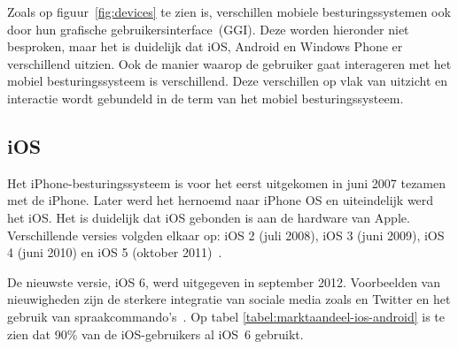 Zoals op figuur~\ref{fig:devices} te zien is, verschillen mobiele besturingssystemen ook door hun grafische gebruikersinterface~(GGI).
Deze worden hieronder niet besproken, maar het is duidelijk dat iOS, Android en Windows Phone er verschillend uitzien.
Ook de manier waarop de gebruiker gaat interageren met het mobiel besturingssysteem is verschillend.
Deze verschillen op vlak van uitzicht en interactie wordt gebundeld in de term  van het mobiel besturingssysteem.

\begin{table}
\centering
{}
\quad
{}
\caption{Marktaandeel van iOS-versies op 8~mei~2013 en Android-versies op 1~mei~2013.  \protect\cite{Smith2013,Android2013}.}
\label{tabel:marktaandeel-ios-android}
\end{table}

\subsection{iOS}
Het iPhone-besturingssysteem is voor het eerst uitgekomen in juni 2007 tezamen met de iPhone. 
Later werd het hernoemd naar iPhone OS en uiteindelijk werd het iOS. 
Het is duidelijk dat iOS gebonden is aan de hardware van Apple. 
Verschillende versies volgden elkaar op: iOS 2 (juli 2008), iOS 3 (juni 2009), iOS 4 (juni 2010) en iOS 5 (oktober 2011)~\cite{Deitel2012, PhilDutson2012}. 

De nieuwste versie, iOS 6, werd uitgegeven in september 2012. 
Voorbeelden van nieuwigheden zijn de sterkere integratie van sociale media zoals \fb{} en Twitter en het gebruik van spraakcommando's~\cite{Deitel2012}. 
Op tabel \ref{tabel:marktaandeel-ios-android} is te zien dat 90\% van de iOS-gebruikers al iOS~6 gebruikt.


